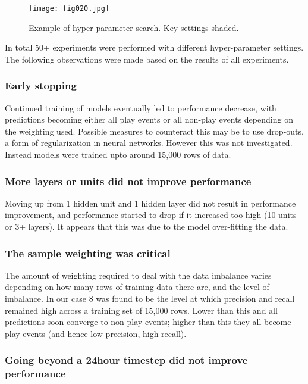 \begin{figure}[h!]
	\centering
	\texttt{[image: fig020.jpg]}
	\caption{Example of hyper-parameter search. Key settings shaded.}
	\label{fig20}
\end{figure} 


In total 50+ experiments were performed with different hyper-parameter settings. The following observations were made based on the results of all experiments.

\subsubsection{Early stopping}

Continued training of models eventually led to performance decrease, with predictions becoming either all play events or all non-play events depending on the weighting used. Possible measures to counteract this may be to use drop-outs, a form of regularization in neural networks. However this was not investigated. Instead models were trained upto around 15,000 rows of data.

\subsubsection{More layers or units did not improve performance}

Moving up from 1 hidden unit and 1 hidden layer did not result in performance improvement, and performance started to drop if it increased too high (10 units or 3+ layers). It appears that this was due to the model over-fitting the data.
 
\subsubsection{The sample weighting was critical}

The amount of weighting required to deal with the data imbalance varies depending on how many rows of training data there are, and the level of imbalance. In our case 8 was found to be the level at which precision and recall remained high across a training set of 15,000 rows. Lower than this and all predictions soon converge to non-play events; higher than this they all become play events (and hence low precision, high recall).

\subsubsection{Going beyond a 24hour timestep did not improve performance}


